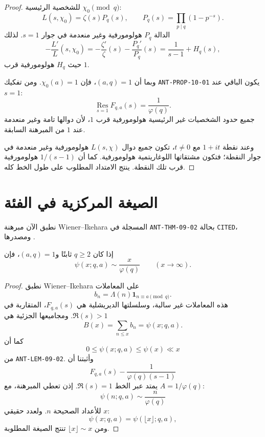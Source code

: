 \begin{proof}
للشخصية الرئيسية \(\chi_0\pmod q\):
\[
L(s,\chi_0)
=
\zeta(s)P_q(s),
\qquad
P_q(s)=\prod_{p\mid q}(1-p^{-s}).
\]
الدالة \(P_q\) هولومورفية وغير منعدمة في جوار \(s=1\). لذلك
\[
-\frac{L'}{L}(s,\chi_0)
=
-\frac{\zeta'}{\zeta}(s)-\frac{P_q'}{P_q}(s)
=
\frac1{s-1}+H_q(s),
\]
حيث \(H_q\) هولومورفية قرب \(1\).

وبما أن \((a,q)=1\)، فإن \(\chi_0(a)=1\). ومن تفكيك
\textenglish{\texttt{ANT-PROP-10-01}} يكون الباقي عند \(s=1\):
\[
\operatorname*{Res}_{s=1}F_{q,a}(s)
=
\frac1{\varphi(q)}.
\]
جميع حدود الشخصيات غير الرئيسية هولومورفية قرب \(1\)، لأن دوالها تامة
وغير منعدمة عند \(1\) من المبرهنة السابقة.

وعند نقطة \(1+it\) مع \(t\ne0\)، تكون جميع دوال \(L(s,\chi)\)
هولومورفية وغير منعدمة في جوار النقطة؛ فتكون مشتقاتها اللوغاريتمية
هولومورفية. كما أن \(1/(s-1)\) هولومورفية قرب تلك النقطة. ينتج الامتداد
المطلوب على طول الخط كله.
\end{proof}

\section{الصيغة المركزية في الفئة}

نطبق الآن مبرهنة Wiener--Ikehara المسجلة في
\textenglish{\texttt{ANT-THM-09-02}} بحالة \textenglish{\texttt{CITED}}،
ومصدرها \cite[Theorem 1.1، الصفحات 1107--1108]{Korevaar2006}.

\begin{theorem}
\label{thm:pnt-ap-psi}
\provedhere
إذا كان \(q\ge2\) ثابتًا و\((a,q)=1\)، فإن
\[
\psi(x;q,a)
\sim
\frac{x}{\varphi(q)}
\qquad(x\to\infty).
\]
\end{theorem}

\begin{proof}
نطبق Wiener--Ikehara على المعاملات
\[
b_n
=
\Lambda(n)\mathbf 1_{n\equiv a\pmod q}.
\]
هذه المعاملات غير سالبة، وسلسلتها الديريشلية هي \(F_{q,a}(s)\)، المتقاربة
في \(\Re(s)>1\). ومجاميعها الجزئية هي
\[
B(x)=\sum_{n\le x}b_n=\psi(x;q,a).
\]
كما أن
\[
0\le\psi(x;q,a)\le\psi(x)\ll x
\]
من \textenglish{\texttt{ANT-LEM-09-02}}. وأثبتنا أن
\[
F_{q,a}(s)-\frac1{\varphi(q)(s-1)}
\]
يمتد عبر الخط \(\Re(s)=1\). إذن تعطي المبرهنة، مع
\(A=1/\varphi(q)\):
\[
\psi(n;q,a)\sim\frac{n}{\varphi(q)}
\]
للأعداد الصحيحة \(n\). ولعدد حقيقي \(x\):
\[
\psi(x;q,a)=\psi(\lfloor x\rfloor;q,a),
\]
ومن \(\lfloor x\rfloor\sim x\) تنتج الصيغة المطلوبة.
\end{proof}

